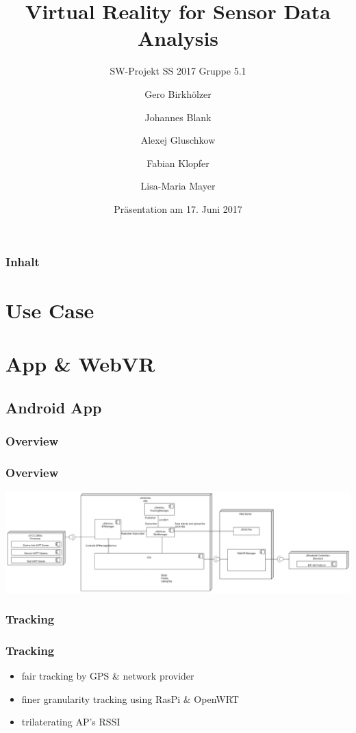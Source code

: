 \documentclass{beamer}
\title{Virtual Reality for Sensor Data Analysis}
\subtitle{SW-Projekt SS 2017 Gruppe 5.1}
\author{Gero Birkh\"olzer \and Johannes Blank \and Alexej Gluschkow \\ \and Fabian Klopfer \and Lisa-Maria Mayer}
\date{Pr\"asentation am 17. Juni 2017}
\begin{document}
\frame{\titlepage}



\begin{frame}
  \frametitle{Inhalt}
  \tableofcontents%
\end{frame}


\section{Use Case}








\section{App \& WebVR}

\subsection{Android App}

\subsubsection{Overview}
\begin{frame} %
\frametitle{Overview}
\includegraphics[width=\textwidth]{../doc/SDD/pics/composite_app.png}
\end{frame}

\subsubsection{Tracking}
\begin{frame}
\frametitle{Tracking}
\begin{itemize}
  \item fair tracking by GPS \& network provider
  \item finer granularity tracking using RasPi \& OpenWRT
  \item	trilaterating AP's RSSI
\end{itemize}
\end{frame}
\end{document}

